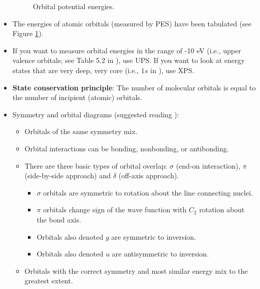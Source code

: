 \documentclass[../notes.tex]{subfiles}
\begin{document}
\begin{itemize}
\begin{figure}[h!]
        \caption{Orbital potential energies.}
        \label{fig:orbitalPotentialEnergies}
    \end{figure}
    \item The energies of atomic orbitals (measured by PES) have been tabulated (see Figure \ref{fig:orbitalPotentialEnergies}).
    \item If you want to measure orbital energies in the range of -10 eV (i.e., upper valence orbitals; see Table 5.2 in \textcite{bib:MiesslerFischerTarr}), use UPS. If you want to look at energy states that are very deep, very core (i.e., $1s$ in ), use XPS.
    \item \textbf{State conservation principle}: The number of molecular orbitals is equal to the number of incipient (atomic) orbitals.
    \item Symmetry and orbital diagrams (suggested reading \textcite{bib:reinforceMOTheory}):
    \begin{itemize}
        \item Orbitals of the same symmetry mix.
        \item Orbital interactions can be bonding, nonbonding, or antibonding.
        \item There are three basic types of orbital overlap: $\sigma$ (end-on interaction), $\pi$ (side-by-side approach) and $\delta$ (off-axis approach).
        \begin{itemize}
            \item $\sigma$ orbitals are symmetric to rotation about the line connecting nuclei.
            \item $\pi$ orbitals change sign of the wave function with $C_2$ rotation about the bond axis.
            \item Orbitals also denoted $g$ are symmetric to inversion.
            \item Orbitals also denoted $u$ are antisymmetric to inversion.
        \end{itemize}
        \item Orbitals with the correct symmetry and most similar energy mix to the greatest extent.

\end{itemize}
\end{itemize}
\end{document}
